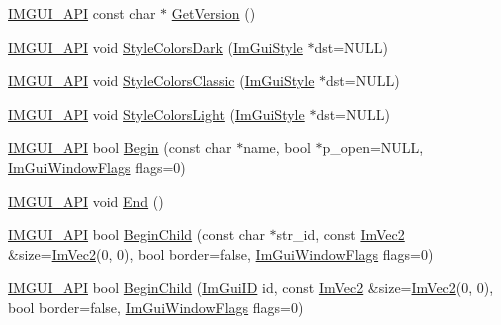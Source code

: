 \begin{DoxyCompactItemize}
\mbox{\hyperlink{imgui_8h_a43829975e84e45d1149597467a14bbf5}{I\+M\+G\+U\+I\+\_\+\+A\+PI}} const char $\ast$ \mbox{\hyperlink{namespace_im_gui_a6488c3cfa6331c8a1e93769e580ce020}{Get\+Version}} ()
\item 
\mbox{\hyperlink{imgui_8h_a43829975e84e45d1149597467a14bbf5}{I\+M\+G\+U\+I\+\_\+\+A\+PI}} void \mbox{\hyperlink{namespace_im_gui_a26c67fc14081b359566d5e135cd8c767}{Style\+Colors\+Dark}} (\mbox{\hyperlink{struct_im_gui_style}{Im\+Gui\+Style}} $\ast$dst=N\+U\+LL)
\item 
\mbox{\hyperlink{imgui_8h_a43829975e84e45d1149597467a14bbf5}{I\+M\+G\+U\+I\+\_\+\+A\+PI}} void \mbox{\hyperlink{namespace_im_gui_a1cf931a42a10f71150def3ce222434b6}{Style\+Colors\+Classic}} (\mbox{\hyperlink{struct_im_gui_style}{Im\+Gui\+Style}} $\ast$dst=N\+U\+LL)
\item 
\mbox{\hyperlink{imgui_8h_a43829975e84e45d1149597467a14bbf5}{I\+M\+G\+U\+I\+\_\+\+A\+PI}} void \mbox{\hyperlink{namespace_im_gui_ae1fc558bfbc557b228d63f7facfc86e1}{Style\+Colors\+Light}} (\mbox{\hyperlink{struct_im_gui_style}{Im\+Gui\+Style}} $\ast$dst=N\+U\+LL)
\item 
\mbox{\hyperlink{imgui_8h_a43829975e84e45d1149597467a14bbf5}{I\+M\+G\+U\+I\+\_\+\+A\+PI}} bool \mbox{\hyperlink{namespace_im_gui_a581e58db0bc930bafa4a5d23093a2b99}{Begin}} (const char $\ast$name, bool $\ast$p\+\_\+open=N\+U\+LL, \mbox{\hyperlink{imgui_8h_a0b8e067ab4f7a818828c8d89e531addc}{Im\+Gui\+Window\+Flags}} flags=0)
\item 
\mbox{\hyperlink{imgui_8h_a43829975e84e45d1149597467a14bbf5}{I\+M\+G\+U\+I\+\_\+\+A\+PI}} void \mbox{\hyperlink{namespace_im_gui_a5479d93794a004c67ceb6d13f37c8254}{End}} ()
\item 
\mbox{\hyperlink{imgui_8h_a43829975e84e45d1149597467a14bbf5}{I\+M\+G\+U\+I\+\_\+\+A\+PI}} bool \mbox{\hyperlink{namespace_im_gui_a5db08f552118a1f946e19b5933dce181}{Begin\+Child}} (const char $\ast$str\+\_\+id, const \mbox{\hyperlink{struct_im_vec2}{Im\+Vec2}} \&size=\mbox{\hyperlink{struct_im_vec2}{Im\+Vec2}}(0, 0), bool border=false, \mbox{\hyperlink{imgui_8h_a0b8e067ab4f7a818828c8d89e531addc}{Im\+Gui\+Window\+Flags}} flags=0)
\item 
\mbox{\hyperlink{imgui_8h_a43829975e84e45d1149597467a14bbf5}{I\+M\+G\+U\+I\+\_\+\+A\+PI}} bool \mbox{\hyperlink{namespace_im_gui_a7001666723434ae00316b8a0160e7de0}{Begin\+Child}} (\mbox{\hyperlink{imgui_8h_a1785c9b6f4e16406764a85f32582236f}{Im\+Gui\+ID}} id, const \mbox{\hyperlink{struct_im_vec2}{Im\+Vec2}} \&size=\mbox{\hyperlink{struct_im_vec2}{Im\+Vec2}}(0, 0), bool border=false, \mbox{\hyperlink{imgui_8h_a0b8e067ab4f7a818828c8d89e531addc}{Im\+Gui\+Window\+Flags}} flags=0)

\end{DoxyCompactItemize}
